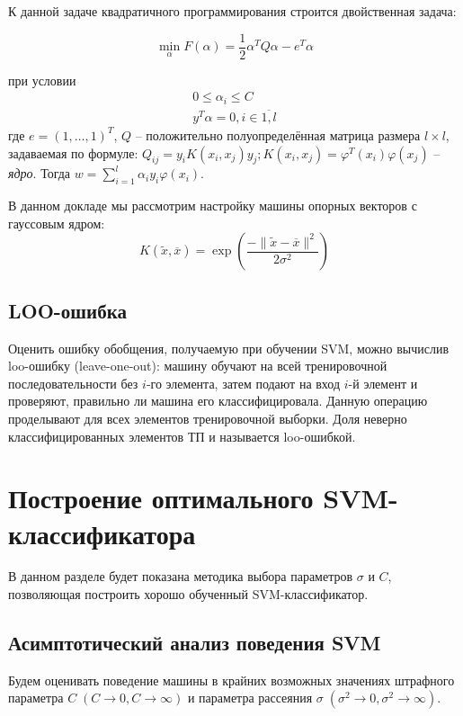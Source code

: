 \documentclass[14pt,a4paper,article]{ncc}
\numberwithin{equation}{subsection}
\begin{document}
К данной задаче квадратичного программирования строится двойственная задача:

\begin{equation}
\min_{\alpha} F(\alpha) = \frac{1}{2}\alpha^TQ\alpha -e^T \alpha
\end{equation}

при условии
\begin{align}
0 \leq \alpha_i \leq C \\
y^T \alpha = 0, i \in \overline{1,l}
\end{align}
где $e=(1, \dots, 1)^T$, $Q$ -- положительно полуопределённая матрица размера $l \times l$, задаваемая по формуле: $Q_{ij}=y_i K(x_i, x_j) y_j; K(x_i, x_j) = \varphi^T(x_i) \varphi(x_j)$ -- \textit{ядро}. Тогда $w= \displaystyle \sum_{i = 1}^{l} \alpha_i y_i \varphi(x_i)$.

В данном докладе мы рассмотрим настройку машины опорных векторов с гауссовым ядром:
\begin{equation}
K(\tilde{x}, \overline{x})= \exp \left( \frac{-\| \tilde{x} - \overline{x} \|^2}{2 \sigma ^2} \right)
\end{equation}

\subsection{LOO-ошибка}

Оценить ошибку обобщения, получаемую при обучении SVM, можно вычислив loo-ошибку (leave-one-out): машину обучают на всей тренировочной последовательности без $i$-го элемента, затем подают на вход $i$-й элемент и проверяют, правильно ли машина его классифицировала. Данную операцию проделывают для всех элементов тренировочной выборки. Доля неверно классифицированных элементов ТП и называется loo-ошибкой.

\section{Построение оптимального SVM-классификатора}

В данном разделе будет показана методика выбора параметров $\sigma$ и $C$, позволяющая построить хорошо обученный SVM-классификатор.

\subsection{Асимптотический анализ поведения SVM}

Будем оценивать поведение машины в крайних возможных значениях штрафного параметра $C \; (C \rightarrow 0, C \rightarrow \infty)$ и параметра рассеяния $\sigma \; (\sigma^2 \rightarrow 0, \sigma^2 \rightarrow \infty)$.
\end{document}
